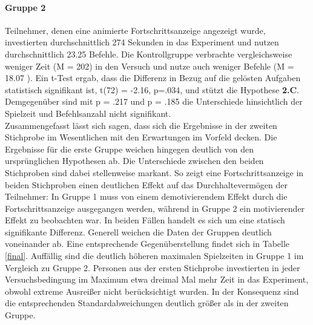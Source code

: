 \paragraph{Gruppe 2}
Teilnehmer, denen eine animierte Fortschrittsanzeige angezeigt wurde, investierten durchschnittlich 274 Sekunden in das Experiment und nutzen durchschnittlich 23.25 Befehle. Die Kontrollgruppe verbrachte vergleichsweise weniger Zeit (M = 202) in den Versuch und nutze auch weniger Befehle (M = 18.07 ). Ein t-Test ergab, dass die Differenz in Bezug auf die gelösten Aufgaben statistisch signifikant ist, t(72) = -2.16, p=.034, und stützt die Hypothese \textbf{2.C}. Demgegenüber sind mit p = .217 und p = .185 die Unterschiede hinsichtlich der Spielzeit und Befehlsanzahl nicht signifikant.\\
 
Zusammengefasst lässt sich sagen, dass sich die Ergebnisse in der zweiten Stichprobe im Wesentlichen mit den Erwartungen im Vorfeld decken. Die Ergebnisse für die erste Gruppe weichen hingegen deutlich von den ursprünglichen Hypothesen ab. Die Unterschiede zwischen den beiden Stichproben sind dabei stellenweise markant. So zeigt eine Fortschrittsanzeige in beiden Stichproben einen deutlichen Effekt auf das Durchhaltevermögen der Teilnehmer: In Gruppe 1 muss von einem demotivierendem Effekt durch die Fortschrittsanzeige ausgegangen werden, während in Gruppe 2 ein motivierender Effekt zu beobachten war. In beiden Fällen handelt es sich um eine statisch signifikante Differenz. Generell weichen die Daten der Gruppen deutlich voneinander ab. Eine entsprechende Gegenüberstellung findet sich in Tabelle \ref{final}. Auffällig sind die deutlich höheren maximalen Spielzeiten in Gruppe 1 im Vergleich zu Gruppe 2. Personen aus der ersten Stichprobe investierten in jeder Versuchsbedingung im Maximum etwa dreimal Mal mehr Zeit in das Experiment, obwohl extreme Ausreißer nicht berücksichtigt wurden. In der Konsequenz sind die entsprechenden Standardabweichungen deutlich größer als in der zweiten Gruppe.



